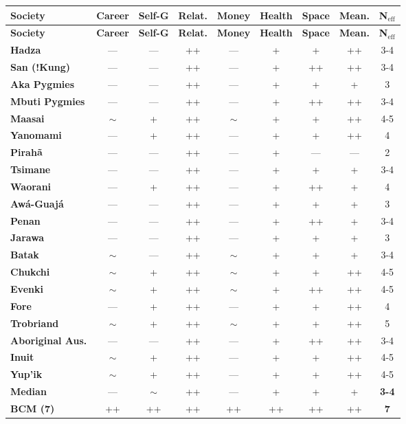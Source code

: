 \begin{center}
\tiny
\begin{longtable}{@{}l|ccccccc|c@{}}
\toprule
\textbf{Society} & \textbf{Career} & \textbf{Self-G} & \textbf{Relat.} & \textbf{Money} & \textbf{Health} & \textbf{Space} & \textbf{Mean.} & \textbf{N$_{\text{eff}}$} \\
\midrule
\endfirsthead
\toprule
\textbf{Society} & \textbf{Career} & \textbf{Self-G} & \textbf{Relat.} & \textbf{Money} & \textbf{Health} & \textbf{Space} & \textbf{Mean.} & \textbf{N$_{\text{eff}}$} \\
\midrule
\endhead
\bottomrule
\endlastfoot
\textbf{Hadza} & — & — & ++ & — & + & + & ++ & 3-4 \\
\textbf{San (!Kung)} & — & — & ++ & — & + & ++ & ++ & 3-4 \\
\textbf{Aka Pygmies} & — & — & ++ & — & + & + & + & 3 \\
\textbf{Mbuti Pygmies} & — & — & ++ & — & + & ++ & ++ & 3-4 \\
\textbf{Maasai} & $\sim$ & + & ++ & $\sim$ & + & + & ++ & 4-5 \\
\midrule
\textbf{Yanomami} & — & + & ++ & — & + & + & ++ & 4 \\
\textbf{Pirahã} & — & — & ++ & — & + & — & — & 2 \\
\textbf{Tsimane} & — & — & ++ & — & + & + & + & 3-4 \\
\textbf{Waorani} & — & + & ++ & — & + & ++ & + & 4 \\
\textbf{Awá-Guajá} & — & — & ++ & — & + & + & + & 3 \\
\midrule
\textbf{Penan} & — & — & ++ & — & + & ++ & + & 3-4 \\
\textbf{Jarawa} & — & — & ++ & — & + & + & + & 3 \\
\textbf{Batak} & $\sim$ & — & ++ & $\sim$ & + & + & + & 3-4 \\
\textbf{Chukchi} & $\sim$ & + & ++ & $\sim$ & + & + & ++ & 4-5 \\
\textbf{Evenki} & $\sim$ & + & ++ & $\sim$ & + & ++ & ++ & 4-5 \\
\midrule
\textbf{Fore} & — & + & ++ & — & + & + & ++ & 4 \\
\textbf{Trobriand} & $\sim$ & + & ++ & $\sim$ & + & + & ++ & 5 \\
\textbf{Aboriginal Aus.} & — & — & ++ & — & + & ++ & ++ & 3-4 \\
\midrule
\textbf{Inuit} & $\sim$ & + & ++ & — & + & + & ++ & 4-5 \\
\textbf{Yup'ik} & $\sim$ & + & ++ & — & + & + & ++ & 4-5 \\
\midrule
\midrule
\textbf{Median} & — & $\sim$ & ++ & — & + & + & + & \textbf{3-4} \\
\textbf{BCM (7)} & ++ & ++ & ++ & ++ & ++ & ++ & ++ & \textbf{7} \\
\end{longtable}
\end{center}


